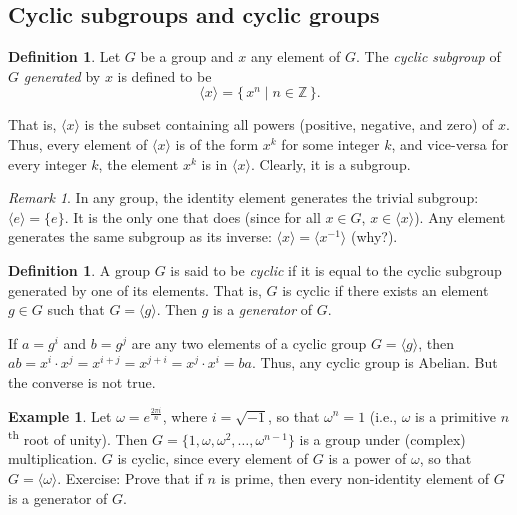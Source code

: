 \documentclass[svgnames]{article}
\theoremstyle{definition}
\newtheorem{Definition}[Theorem]{Definition}
\newtheorem{Example}[Theorem]{Example}
\theoremstyle{remark}
\newtheorem*{Remark*}{Remark}
\renewcommand{\th}{\textsuperscript{th}\xspace}
\begin{document}
\subsection{Cyclic subgroups and cyclic groups}\label{subsec:CycGroups}
\begin{Definition}\label{def:CycSubgroup}
Let $G$ be a group and $x$ any element of $G$. The \emph{cyclic subgroup} of $G$ \emph{generated} by $x$ is defined to be
\begin{equation*}
\langle x \rangle = \{\, x^n \mid n \in \mathbb Z \,\}.
\end{equation*}
\end{Definition}

That is, $\langle x \rangle$ is the subset containing all powers (positive, negative, and zero) of $x$. Thus, every element of $\langle x \rangle$ is of the form $x^k$ for some integer $k$, and vice-versa for every integer $k$, the element $x^k$ is in $\langle x \rangle$. Clearly, it is a subgroup.

\begin{Remark*}
In any group, the identity element generates the trivial subgroup: $\langle e \rangle = \{e\}$. It is the only one that does (since for all $x \in G$, $x \in \langle x \rangle$). Any element generates the same subgroup as its inverse: $\langle x \rangle = \langle x^{-1} \rangle$ (why?).
\end{Remark*}

\begin{Definition}
A group $G$ is said to be \emph{cyclic} if it is equal to the cyclic subgroup generated by one of its elements. That is, $G$ is cyclic if there exists an element $g \in G$ such that $G = \langle g \rangle$. Then $g$ is a \emph{generator} of $G$.
\end{Definition}

If $a = g^i$ and $b = g^j$ are any two elements of a cyclic group $G = \langle g \rangle$, then $ab = x^i \cdot x^j = x^{i + j} = x^{j + i} = x^j \cdot x^i = ba$. Thus, any cyclic group is Abelian. But the converse is not true.

\begin{Example}\label{ex:RootsOfUnity}
Let $\omega = e^{\frac{2 \pi i}{n}}$, where $i = \sqrt{-1}$, so that $\omega^n = 1$ (i.e., $\omega$ is a primitive $n$\th root of unity). Then $G = \{1, \omega, \omega^2, \ldots, \omega^{n - 1}\}$ is a group under (complex) multiplication. $G$ is cyclic, since every element of $G$ is a power of $\omega$, so that $G = \langle \omega \rangle$. {\small Exercise: Prove that if $n$ is prime, then every non-identity element of $G$ is a generator of $G$}.
\end{Example}
\end{document}
